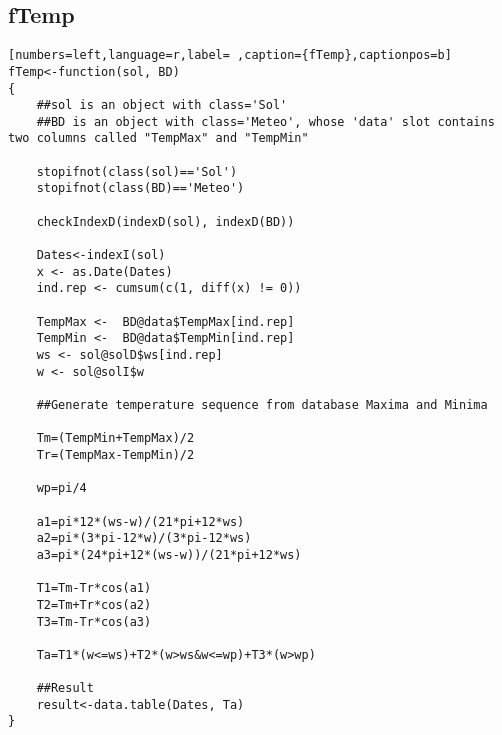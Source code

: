 \subsection{fTemp}
\label{sec:orgc57cd86}
\begin{lstlisting}[numbers=left,language=r,label= ,caption={fTemp},captionpos=b]
fTemp<-function(sol, BD)
{
    ##sol is an object with class='Sol'
    ##BD is an object with class='Meteo', whose 'data' slot contains two columns called "TempMax" and "TempMin"

    stopifnot(class(sol)=='Sol')
    stopifnot(class(BD)=='Meteo')

    checkIndexD(indexD(sol), indexD(BD))

    Dates<-indexI(sol)	
    x <- as.Date(Dates)
    ind.rep <- cumsum(c(1, diff(x) != 0))

    TempMax <-  BD@data$TempMax[ind.rep]
    TempMin <-  BD@data$TempMin[ind.rep]
    ws <- sol@solD$ws[ind.rep]
    w <- sol@solI$w

    ##Generate temperature sequence from database Maxima and Minima

    Tm=(TempMin+TempMax)/2
    Tr=(TempMax-TempMin)/2

    wp=pi/4

    a1=pi*12*(ws-w)/(21*pi+12*ws)
    a2=pi*(3*pi-12*w)/(3*pi-12*ws)
    a3=pi*(24*pi+12*(ws-w))/(21*pi+12*ws)

    T1=Tm-Tr*cos(a1)
    T2=Tm+Tr*cos(a2)
    T3=Tm-Tr*cos(a3)

    Ta=T1*(w<=ws)+T2*(w>ws&w<=wp)+T3*(w>wp)

    ##Result
    result<-data.table(Dates, Ta)
}
\end{lstlisting}
